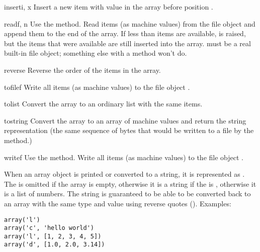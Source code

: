 \begin{funcdesc}{insert}{i, x}
Insert a new item with value  in the array before position
.
\end{funcdesc}

\begin{funcdesc}{read}{f, n}
  {Use the  method.}
Read  items (as machine values) from the file object 
and append them to the end of the array.  If less than  items
are available,  is raised, but the items that were
available are still inserted into the array.   must be a real
built-in file object; something else with a  method won't
do.
\end{funcdesc}

\begin{funcdesc}{reverse}{}
Reverse the order of the items in the array.
\end{funcdesc}

\begin{funcdesc}{tofile}{f}
Write all items (as machine values) to the file object .
\end{funcdesc}

\begin{funcdesc}{tolist}{}
Convert the array to an ordinary list with the same items.
\end{funcdesc}

\begin{funcdesc}{tostring}{}
Convert the array to an array of machine values and return the
string representation (the same sequence of bytes that would
be written to a file by the  method.)
\end{funcdesc}

\begin{funcdesc}{write}{f}
  {Use the  method.}
Write all items (as machine values) to the file object .
\end{funcdesc}

When an array object is printed or converted to a string, it is
represented as .  The
 is omitted if the array is empty, otherwise it is a
string if the  is , otherwise it is a list of
numbers.  The string is guaranteed to be able to be converted back to
an array with the same type and value using reverse quotes
().  Examples:

\begin{verbatim}
array('l')
array('c', 'hello world')
array('l', [1, 2, 3, 4, 5])
array('d', [1.0, 2.0, 3.14])
\end{verbatim}
